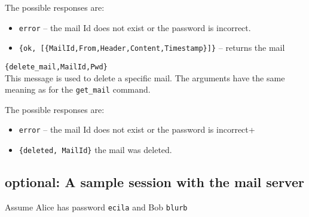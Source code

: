 \documentclass[12pt]{hitec}
\begin{document}
\begin{description}
  The possible responses are:
  
  \begin{itemize}
  
  \item \verb+error+ -- the mail Id does not exist or the password is incorrect.
  
\item \verb+{ok, [{MailId,From,Header,Content,Timestamp}]}+ -- returns the mail
  \end{itemize}

 
\item \verb+{delete_mail,MailId,Pwd}+\\
  This message is used to delete a specific mail. The arguments have the same
  meaning as for the \verb+get_mail+ command.

  The possible responses are:
  
  \begin{itemize}
  
  \item \verb+error+ -- the mail Id does not exist or the password is incorrect+
    
  \item \verb+{deleted, MailId}+ the mail was deleted.
    
  \end{itemize}

  

\end{description}

\subsection{optional: A sample session with the mail server}

Assume Alice has password \verb+ecila+  and Bob \verb+blurb+
\end{document}
